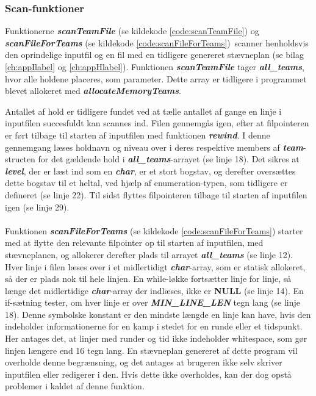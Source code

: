 \subsubsection{Scan-funktioner}
Funktionerne \textbf{\textit{scanTeamFile}} (se kildekode \ref{code:scanTeamFile}) og \textbf{\textit{scanFileForTeams}} (se kildekode \ref{code:scanFileForTeams})\ scanner henholdsvis den oprindelige inputfil og en fil med en tidligere genereret stævneplan (se bilag \ref{ch:appIlabel} og \ref{ch:appHlabel}). Funktionen \textbf{\textit{scanTeamFile}} tager \textbf{\textit{all\_teams}}, hvor alle holdene placeres, som parameter. Dette array er tidligere i programmet blevet allokeret med \textbf{\textit{allocateMemoryTeams}}.
\par
Antallet af hold er tidligere fundet ved at tælle antallet af gange en linje i inputfilen succesfuldt kan scannes ind. Filen gennemgås igen, efter at filpointeren er ført tilbage til starten af inputfilen med funktionen \textbf{\textit{rewind}}. I denne gennemgang læses holdnavn og niveau over i deres respektive members af \textbf{\textit{team}}-structen for det gældende hold i \textbf{\textit{all\_teams}}-arrayet (se linje 18). Det sikres at \textbf{\textit{level}}, der er læst ind som en \textbf{\textit{char}}, er et stort bogstav, og derefter oversættes dette bogstav til et heltal, ved hjælp af enumeration-typen, som tidligere er defineret (se linje 22). Til sidst flyttes filpointeren tilbage til starten af inputfilen igen (se linje 29).
\\\\
Funktionen \textbf{\textit{scanFileForTeams}} (se kildekode \ref{code:scanFileForTeams}) starter med at flytte den relevante filpointer op til starten af inputfilen, med stævneplanen, og allokerer derefter plads til arrayet \textbf{\textit{all\_teams}} (se linje 12). Hver linje i filen læses over i et midlertidigt \textbf{\textit{char}}-array, som er statisk allokeret, så der er plads nok til hele linjen. En while-løkke fortsætter linje for linje, så længe det midlertidige \textbf{\textit{char}}-array der indlæses, ikke er \textbf{NULL} (se linje 14). En if-sætning tester, om hver linje er over \textbf{\textit{MIN\_LINE\_LEN}} tegn lang (se linje 18). Denne symbolske konstant er den mindste længde en linje kan have, hvis den indeholder informationerne for en kamp i stedet for en runde eller et tidspunkt. Her antages det, at linjer med runder og tid ikke indeholder whitespace, som gør linjen længere end 16 tegn lang. En stævneplan genereret af dette program vil overholde denne begrænsning, og det antages at brugeren ikke selv skriver inputfilen eller redigerer i den. Hvis dette ikke overholdes, kan der dog opstå problemer i kaldet af denne funktion. 


